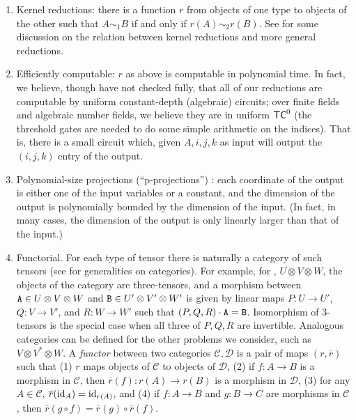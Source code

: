 \documentclass[11pt]{article}
\begin{document}
\begin{enumerate}
\item \label{reduction:kernel} Kernel reductions: there is a function $r$ from objects of one type to objects of the other such that $A \sim_1 B$ if and only if $r(A) \sim_2 r(B)$.  See \cite{FortnowGrochowPEq} for some discussion on the relation between kernel reductions and more general reductions.

\item \label{reduction:efficient} Efficiently computable: $r$ as above is computable in polynomial time. In fact, we believe, though have not checked fully, that all of our reductions are computable by uniform constant-depth (algebraic) circuits; over finite fields and algebraic number fields, we believe they are in uniform $\mathsf{TC}^0$ (the threshold gates are needed to do some simple arithmetic on the indices). That is, there is a small circuit which, given $A,i,j,k$ as input will output the $(i,j,k)$ entry of the output.

\item \label{reduction:projection} Polynomial-size projections (``p-projections'') \cite{valiantProj}: each coordinate of the output is either one of the input variables or a constant, and the dimension of the output is polynomially bounded by the dimension of the input. (In fact, in many cases, the dimension of the output is only linearly larger than that of the input.)

\item \label{reduction:functorial} Functorial. For each type of tensor there is naturally a category of such tensors (see \cite{MacLane} for generalities on categories). For example, for \ThreeTI, $U \otimes V \otimes W$, the objects of the category are three-tensors, and a morphism between $\mathtt{A} \in U \otimes V \otimes W$ and $\mathtt{B} \in U' \otimes V' \otimes W'$ is given by linear maps $P: U \to U'$, $Q\colon V \to V'$, and $R\colon W \to W'$ such that $(P,Q,R) \cdot \mathtt{A} = \mathtt{B}$. Isomorphism of 3-tensors is the special case when all three of $P,Q,R$ are invertible. Analogous categories can be defined for the other problems we consider, such as $V \otimes V^* \otimes W$. A \emph{functor} between two categories $\mathcal{C}, \mathcal{D}$ is a pair of maps $(r,\overline{r})$ such that (1) $r$ maps objects of $\mathcal{C}$ to objects of $\mathcal{D}$, (2) if $f\colon A \to B$ is a morphism in $\mathcal{C}$, then $\overline{r}(f)\colon r(A) \to r(B)$ is a morphism in $\mathcal{D}$, (3) for any $A \in \mathcal{C}$, $\overline{r}(\operatorname{id}_A) = \operatorname{id}_{r(A)}$, and (4) if $f\colon A \to B$ and $g\colon B \to C$ are morphisms in $\mathcal{C}$, then $\overline{r}(g \circ f) = \overline{r}(g) \circ \overline{r}(f)$.


\end{enumerate}
\end{document}
